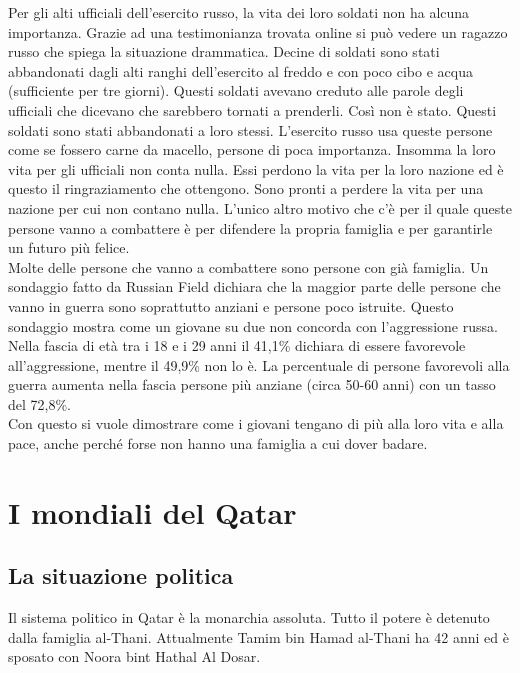 \documentclass[a4paper, 12pt]{article}
\begin{document}
Per gli alti ufficiali dell'esercito russo, la vita dei loro soldati non ha alcuna importanza. Grazie ad una testimonianza trovata online si può vedere un ragazzo russo che spiega la situazione drammatica. Decine di soldati sono stati abbandonati dagli alti ranghi dell'esercito al freddo e con poco cibo e acqua (sufficiente per tre giorni). Questi soldati avevano creduto alle parole degli ufficiali che dicevano che sarebbero tornati a prenderli. Così non è stato. Questi soldati sono stati abbandonati a loro stessi. L'esercito russo usa queste persone come se fossero carne da macello, persone di poca importanza. Insomma la loro vita per gli ufficiali non conta nulla. Essi perdono la vita per la loro nazione ed è questo il ringraziamento che ottengono. Sono pronti a perdere la vita per una nazione per cui non contano nulla. L'unico altro motivo che c'è per il quale queste persone vanno a combattere è per difendere la propria famiglia e per garantirle un futuro più felice. \\ Molte delle persone che vanno a combattere sono persone con già famiglia. Un sondaggio fatto da Russian Field dichiara che la maggior parte delle persone che vanno in guerra sono soprattutto anziani e persone poco istruite. Questo sondaggio mostra come un giovane su due non concorda con l'aggressione russa. Nella fascia di età tra i 18 e i 29 anni il 41,1\% dichiara di essere favorevole all'aggressione, mentre il 49,9\% non lo è. La percentuale di persone favorevoli alla guerra aumenta nella fascia persone più anziane (circa 50-60 anni) con un tasso del 72,8\%. \\ Con questo si vuole dimostrare come i giovani tengano di più alla loro vita e alla pace, anche perché forse non hanno una famiglia a cui dover badare.

\pagebreak

\section{I mondiali del Qatar}

\subsection{La situazione politica}

Il sistema politico in Qatar è la monarchia assoluta. Tutto il potere è detenuto dalla famiglia al-Thani. Attualmente Tamim bin Hamad al-Thani ha 42 anni ed è sposato con Noora bint Hathal Al Dosar.

\end{document}
